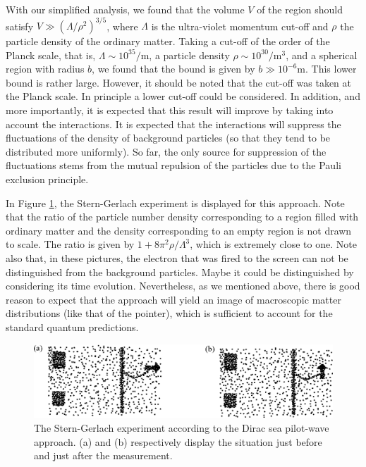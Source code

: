\documentclass[12pt]{article}
\begin{document}
With our simplified analysis, we found that the volume $V$ of the region should satisfy $V \gg (\Lambda / \rho^2)^{3/5}$, where $\Lambda$ is the ultra-violet momentum cut-off and $\rho$ the particle density of the ordinary matter. Taking a cut-off of the order of the Planck scale, that is, $\Lambda \sim 10^{35}/$m, a particle density $\rho \sim 10^{30}/$m$^3$, and a spherical region with radius $b$, we found that the bound is given by $b \gg 10^{-6}$m. This lower bound is rather large. However, it should be noted that the cut-off was taken at the Planck scale. In principle a lower cut-off could be considered. In addition, and more importantly, it is expected that this result will improve by taking into account the interactions. It is expected that the interactions will suppress the fluctuations of the density of background particles (so that they tend to be distributed more uniformly). So far, the only source for suppression of the fluctuations stems from the mutual repulsion of the particles due to the Pauli exclusion principle.

In Figure \ref{diracsea}, the Stern-Gerlach experiment is displayed for this approach. Note that the ratio of the particle number density corresponding to a region filled with ordinary matter and the density corresponding to an empty region is not drawn to scale. The ratio is given by $1+8\pi^2 \rho/ \Lambda^3$, which is extremely close to one. Note also that, in these pictures, the electron that was fired to the screen can not be distinguished from the background particles. Maybe it could be distinguished by considering its time evolution. Nevertheless, as we mentioned above, there is good reason to expect that the approach will yield an image of macroscopic matter distributions (like that of the pointer), which is sufficient to account for the standard quantum predictions. 

\begin{figure}
\begin{center}
\includegraphics{diracsea.eps}
\end{center}
\caption{\label{diracsea}The Stern-Gerlach experiment according to the Dirac sea pilot-wave approach. (a) and (b) respectively display the situation just before and just after the measurement.}
\end{figure}
\end{document}
